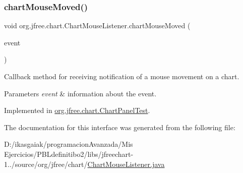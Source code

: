 \subsubsection{\texorpdfstring{chart\+Mouse\+Moved()}{chartMouseMoved()}}
{\footnotesize\ttfamily void org.\+jfree.\+chart.\+Chart\+Mouse\+Listener.\+chart\+Mouse\+Moved (\begin{DoxyParamCaption}\item[{\mbox{\hyperlink{classorg_1_1jfree_1_1chart_1_1_chart_mouse_event}{Chart\+Mouse\+Event}}}]{event }\end{DoxyParamCaption})}

Callback method for receiving notification of a mouse movement on a chart.


\begin{DoxyParams}{Parameters}
{\em event} & information about the event. \\
\hline
\end{DoxyParams}


Implemented in \mbox{\hyperlink{classorg_1_1jfree_1_1chart_1_1_chart_panel_test_af9a45698f4c232b2b9ff6fe9dd450c79}{org.\+jfree.\+chart.\+Chart\+Panel\+Test}}.



The documentation for this interface was generated from the following file\+:\begin{DoxyCompactItemize}
\item 
D\+:/ikasgaiak/programacion\+Avanzada/\+Mis Ejercicios/\+P\+B\+Ldefinitibo2/libs/jfreechart-\/1../source/org/jfree/chart/\mbox{\hyperlink{_chart_mouse_listener_8java}{Chart\+Mouse\+Listener.\+java}}\end{DoxyCompactItemize}
